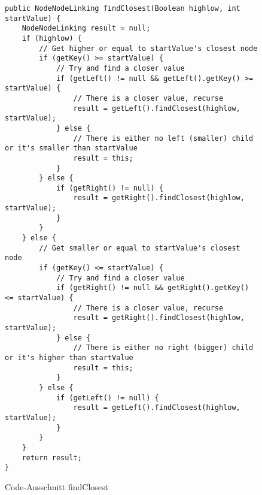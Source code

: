 \documentclass[11pt]{scrartcl}
\begin{document}
\begin{figure}
\begin{verbatim}
public NodeNodeLinking findClosest(Boolean highlow, int startValue) {
    NodeNodeLinking result = null;
    if (highlow) {
        // Get higher or equal to startValue's closest node
        if (getKey() >= startValue) {
            // Try and find a closer value
            if (getLeft() != null && getLeft().getKey() >= startValue) {
                // There is a closer value, recurse
                result = getLeft().findClosest(highlow, startValue);
            } else {
                // There is either no left (smaller) child or it's smaller than startValue
                result = this;
            }
        } else {
            if (getRight() != null) {
                result = getRight().findClosest(highlow, startValue);
            }
        }
    } else {
        // Get smaller or equal to startValue's closest node
        if (getKey() <= startValue) {
            // Try and find a closer value
            if (getRight() != null && getRight().getKey() <= startValue) {
                // There is a closer value, recurse
                result = getRight().findClosest(highlow, startValue);
            } else {
                // There is either no right (bigger) child or it's higher than startValue
                result = this;
            }
        } else {
            if (getLeft() != null) {
                result = getLeft().findClosest(highlow, startValue);
            }
        }
    }
    return result;
}
\end{verbatim}
\caption{Code-Ausschnitt findClosest}
\label{figure:findClosest}
\end{figure}
\end{document}
